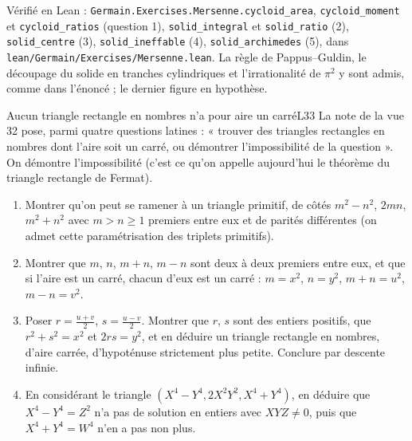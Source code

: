 \documentclass[11pt,a4paper]{article}
\begin{document}
\begin{solution}
Vérifié en Lean : \texttt{Germain.Exercises.Mersenne.cycloid\_area},
\texttt{cycloid\_moment} et \texttt{cycloid\_ratios} (question 1), \texttt{solid\_integral} et
\texttt{solid\_ratio} (2), \texttt{solid\_centre} (3), \texttt{solid\_ineffable} (4),
\texttt{solid\_archimedes} (5), dans \texttt{lean/Germain/Exercises/Mersenne.lean}. La règle de Pappus--Guldin, le
découpage du solide en tranches cylindriques et l'irrationalité de $\pi^2$ y sont admis, comme
dans l'énoncé ; le dernier figure en hypothèse.
\end{solution}

\begin{exercice}{Aucun triangle rectangle en nombres n'a pour aire un carré}{L3}{3}
La note de la vue 32 pose, parmi quatre questions latines : « trouver des
triangles rectangles en nombres dont l'aire soit un carré, ou démontrer
l'impossibilité de la question ». On démontre l'impossibilité (c'est ce qu'on
appelle aujourd'hui le théorème du triangle rectangle de Fermat).
\begin{enumerate}
\item Montrer qu'on peut se ramener à un triangle primitif, de côtés
  $m^2 - n^2$, $2mn$, $m^2 + n^2$ avec $m > n \ge 1$ premiers entre eux et de
  parités différentes (on admet cette paramétrisation des triplets primitifs).
\item Montrer que $m$, $n$, $m+n$, $m-n$ sont deux à deux premiers entre eux, et
  que si l'aire est un carré, chacun d'eux est un carré :
  $m = x^2$, $n = y^2$, $m + n = u^2$, $m - n = v^2$.
\item Poser $r = \frac{u+v}{2}$, $s = \frac{u-v}{2}$. Montrer que $r$, $s$ sont des
  entiers positifs, que $r^2 + s^2 = x^2$ et $2rs = y^2$, et en déduire un
  triangle rectangle en nombres, d'aire carrée, d'hypoténuse strictement plus
  petite. Conclure par descente infinie.
\item En considérant le triangle $(X^4 - Y^4, 2X^2Y^2, X^4 + Y^4)$, en déduire
  que $X^4 - Y^4 = Z^2$ n'a pas de solution en entiers avec $XYZ \neq 0$, puis que
  $X^4 + Y^4 = W^4$ n'en a pas non plus.
\end{enumerate}
\end{exercice}
\end{document}
